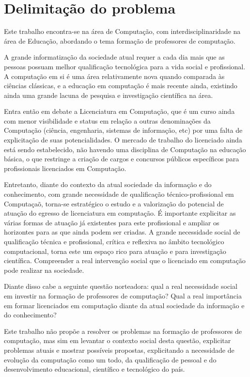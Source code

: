 \section{Delimitação do problema}%


Este trabalho encontra-se na área de Computação, com interdisciplinaridade na área de Educação, abordando o tema formação de professores de computação.

A grande informatização da sociedade atual requer a cada dia mais que as pessoas possuam melhor qualificação tecnológica para a vida social e profissional. A computação em si é uma área relativamente nova quando comparada às ciências clássicas, e a educação em computação é mais recente ainda, existindo ainda uma grande lacuna de pesquisa e investigação científica na área.

Entra então em debate a Licenciatura em Computação, que é um curso ainda com menor visibilidade e status em relação a outras denominações da Computação (ciência, engenharia, sistemas de informação, etc) por uma falta de explicitação de suas potencialidades. O mercado de trabalho do licenciado ainda está sendo estabelecido, não havendo uma disciplina de Computação na educação básica, o que restringe a criação de cargos e concursos públicos específicos para profissionais licenciados em Computação.

Entretanto, diante do contexto da atual sociedade da informação e do conhecimento, com grande necessidade de qualificação técnico-profissional em Computaçaõ, torna-se estratégico o estudo e a valorização do potencial de atuação do egresso de licenciatura em computação. É importante explicitar as várias formas de atuação já existentes para este profissional e ampliar os horizontes para as que ainda podem ser criadas. A grande necessidade social de qualificação técnica e profissional, crítica e reflexiva no âmbito tecnológico computacional, torna este um espaço rico para atuação e para investigação científica. Compreender a real intervenção social que o licenciado em computação pode realizar na sociedade.


Diante disso cabe a seguinte questão norteadora: qual a real necessidade social em investir na formação de professores de computação? Qual a real importância em formar licenciados em computação diante da atual sociedade da informação e do conhecimento?

Este trabalho não propõe a resolver os problemas na formação de professores de computação, mas sim em levantar o contexto social desta questão, explicitar problemas atuais e mostrar possíveis propostas, explicitando a necessidade de evolução da computação como um todo, da qualificação de pessoal e do desenvolvimento educacional, científico e tecnológico do país. 



